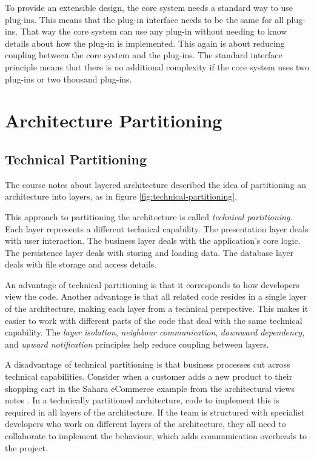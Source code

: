 To provide an extensible design, the core system needs a standard way to use plug-ins.
This means that the plug-in interface needs to be the same for all plug-ins.
That way the core system can use any plug-in without needing to know details about how the plug-in is implemented.
This again is about reducing coupling between the core system and the plug-ins.
The standard interface principle means that there is no additional complexity if the core system uses two plug-ins or two thousand plug-ins.


\section{Architecture Partitioning}

\subsection{Technical Partitioning}
The course notes about layered architecture \cite{layered-notes}
described the idea of partitioning an architecture into layers, as in figure \ref{fig:technical-partitioning}.

This approach to partitioning the architecture is called \emph{technical partitioning}.
Each layer represents a different technical capability.
The presentation layer deals with user interaction.
The business layer deals with the application's core logic.
The persistence layer deals with storing and loading data.
The database layer deals with file storage and access details.

\clearpage
An advantage of technical partitioning is that it corresponds to how developers view the code.
Another advantage is that all related code resides in a single layer of the architecture, making each layer
 from a technical perspective.
This makes it easier to work with different parts of the code that deal with the same technical capability.
The \emph{layer isolation}, \emph{neighbour communication}, \emph{downward dependency},
and \emph{upward notification} principles help reduce coupling between layers.

A disadvantage of technical partitioning is that business processes cut across technical capabilities.
Consider when a customer adds a new product to their shopping cart in the Sahara eCommerce example
from the architectural views notes \cite{view-notes}.
In a technically partitioned architecture, code to implement this is required in all layers of the architecture.
If the team is structured with specialist developers who work on different layers of the architecture,
they all need to collaborate to implement the behaviour, which adds communication overheads to the project.

